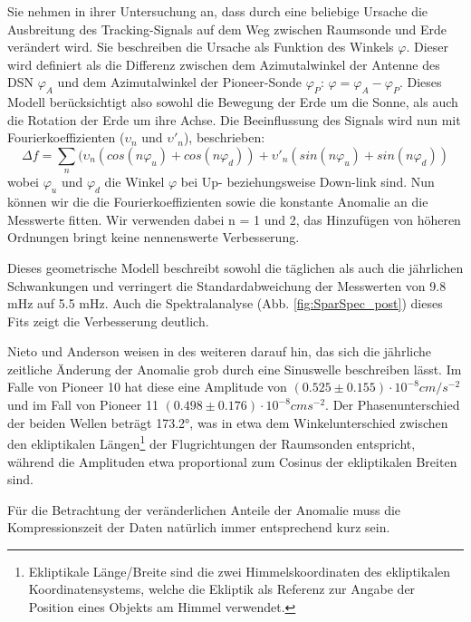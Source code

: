 Sie nehmen in ihrer Untersuchung an, dass durch eine beliebige Ursache die Ausbreitung des Tracking-Signals auf
dem Weg zwischen Raumsonde und Erde verändert wird. Sie beschreiben die Ursache als Funktion des Winkels $\varphi$. Dieser wird definiert als die Differenz zwischen dem Azimutalwinkel der Antenne des DSN $\varphi_A$ und dem Azimutalwinkel der Pioneer-Sonde $\varphi_P$: $\varphi=\varphi_A-\varphi_P$. %
Dieses Modell berücksichtigt also sowohl die Bewegung der Erde um die Sonne, als auch die Rotation der Erde um ihre Achse.
Die Beeinflussung des Signals wird nun mit Fourierkoeffizienten ($\upsilon_n$ und $\upsilon'_n$), beschrieben:
\begin{equation}
\Delta f = \sum_n (\upsilon_n(cos(n\varphi_u)+cos(n\varphi_d))+\upsilon'_n(sin(n\varphi_u)+sin(n\varphi_d))
\end{equation}
wobei $\varphi_u$ und $\varphi_d$ die Winkel $\varphi$ bei Up- beziehungsweise Down-link sind.
Nun können wir die die Fourierkoeffizienten sowie die konstante Anomalie an die Messwerte fitten. Wir verwenden dabei n = 1 und 2, das Hinzufügen von höheren Ordnungen bringt keine nennenswerte Verbesserung.

Dieses geometrische Modell beschreibt sowohl die täglichen als auch die jährlichen
Schwankungen und verringert die Standardabweichung der Messwerten von 9.8 mHz auf 5.5 mHz.
Auch die Spektralanalyse (Abb. \ref{fig:SparSpec_post}) dieses Fits zeigt die Verbesserung deutlich.\cite{Levy2008} %

Nieto und Anderson weisen in \cite{Nieto2005} des weiteren darauf hin, das sich die jährliche zeitliche Änderung der Anomalie %
grob durch eine Sinuswelle beschreiben lässt. Im Falle von Pioneer 10 hat diese eine Amplitude von $(0.525\pm0.155)\cdot10^{-8}cm/s^{-2}$ und im Fall von Pioneer 11 $(0.498\pm0.176)\cdot10^{-8}cms^{-2}$. Der Phasenunterschied der beiden Wellen beträgt 173.2°, was in etwa dem Winkelunterschied zwischen den ekliptikalen Längen\footnote{Ekliptikale Länge/Breite sind die zwei Himmelskoordinaten des ekliptikalen Koordinatensystems, welche die Ekliptik als Referenz zur Angabe der Position eines Objekts am Himmel verwendet.} der Flugrichtungen der Raumsonden entspricht, während die Amplituden etwa proportional zum Cosinus der ekliptikalen Breiten sind.

Für die Betrachtung der veränderlichen Anteile der Anomalie muss die Kompressionszeit der Daten natürlich immer entsprechend kurz sein.\cite{Nieto2005}